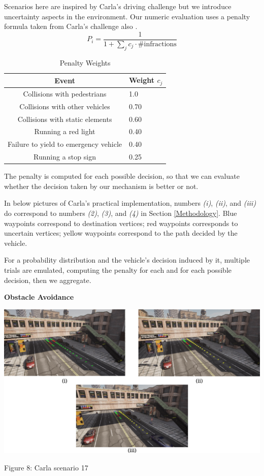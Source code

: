 Scenarios here are inspired by Carla's driving challenge \cite{scenarios-carla} but we introduce uncertainty aspects in the environment. Our numeric evaluation uses a penalty formula taken from Carla's challenge also \cite{eval-carla}.
$$
P_i = \frac{1}{1 + \sum_j c_j \cdot \text{\#infractions} }
$$
\begin{table}[h]
\centering
\begin{tabular}{cl}
\toprule
\textbf{Event} & \textbf{Weight $c_j$} \\
\midrule
Collisions with pedestrians & 1.0 \\
Collisions with other vehicles & 0.70 \\
Collisions with static elements & 0.60 \\
Running a red light & 0.40 \\
Failure to yield to emergency vehicle & 0.40 \\
Running a stop sign &0.25 \\
\bottomrule
\end{tabular}
\caption{Penalty Weights}
\label{table:1}
\end{table}

The penalty is computed for each possible decision, so that we can evaluate whether the decision taken by our mechanism is better or not.

In below pictures of Carla's practical implementation, numbers \textit{(i)}, \textit{(ii)}, and \textit{(iii)} do correspond to numbers \textit{(2)}, \textit{(3)}, and \textit{(4)} in Section \ref{Methodology}. Blue waypoints correspond to destination vertices; red waypoints corresponds to uncertain vertices; yellow waypoints correspond to the path decided by the vehicle.

For a probability distribution and the vehicle's decision induced by it, multiple trials are emulated, computing the penalty for each and for each possible decision, then we aggregate. 

\textbf{Obstacle Avoidance}

\includegraphics[width=\textwidth]{images/lane-change.png}
\begin{center} Figure 8: Carla scenario 17 \end{center}

